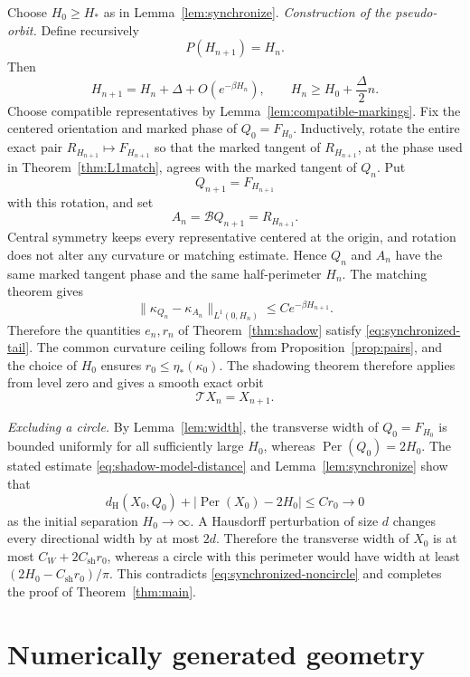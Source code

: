 \documentclass[11pt]{article}
\theoremstyle{remark}
\newcommand{\Tmap}{\mathcal T}
\newcommand{\Bmap}{\mathcal B}
\newcommand{\norm}[1]{\lVert #1\rVert}
\newcommand{\Per}{\operatorname{Per}}
\begin{document}
Choose \(H_0\geq H_*\) as in Lemma~\ref{lem:synchronize}.
\emph{Construction of the pseudo-orbit.}
Define recursively
\begin{equation}\label{eq:Hrec}
  P(H_{n+1})=H_n.
\end{equation}
Then
\[
  H_{n+1}=H_n+\Delta+O(e^{-\beta H_n}),
  \qquad
  H_n\geq H_0+\frac\Delta2n.
\]
Choose compatible representatives by Lemma~\ref{lem:compatible-markings}.
Fix the centered orientation and marked phase of \(Q_0=F_{H_0}\).
Inductively, rotate the entire exact pair
\(R_{H_{n+1}}\mapsto F_{H_{n+1}}\) so that the marked tangent of
\(R_{H_{n+1}}\), at the phase used in Theorem~\ref{thm:L1match}, agrees with
the marked tangent of \(Q_n\).  Put
\[
  Q_{n+1}=F_{H_{n+1}}
\]
with this rotation, and set
\[
  A_n=\Bmap Q_{n+1}=R_{H_{n+1}}.
\]
Central symmetry keeps every representative centered at the origin, and
rotation does not alter any curvature or matching estimate.  Hence \(Q_n\)
and \(A_n\) have the same marked tangent phase and the same half-perimeter
\(H_n\).  The matching theorem gives
\[
  \norm{\kappa_{Q_n}-\kappa_{A_n}}_{L^1(0,H_n)}
  \leq Ce^{-\beta H_{n+1}}.
\]
Therefore the quantities \(e_n,r_n\) of
Theorem~\ref{thm:shadow} satisfy \eqref{eq:synchronized-tail}.  The common
curvature ceiling follows from Proposition~\ref{prop:pairs}, and the choice
of \(H_0\) ensures \(r_0\leq\eta_*(\kappa_0)\).  The shadowing theorem
therefore applies from level zero and gives a smooth exact orbit
\[
  \Tmap X_n=X_{n+1}.
\]

\emph{Excluding a circle.}
By Lemma~\ref{lem:width}, the transverse width of \(Q_0=F_{H_0}\) is
bounded uniformly for all sufficiently large \(H_0\), whereas
\(\Per(Q_0)=2H_0\).  The stated estimate \eqref{eq:shadow-model-distance} and
Lemma~\ref{lem:synchronize} show that
\[
   d_{\mathrm H}(X_0,Q_0)+|\Per(X_0)-2H_0|
      \leq Cr_0\longrightarrow0
\]
as the initial separation \(H_0\to\infty\).  A Hausdorff perturbation of
size \(d\) changes every directional width by at most \(2d\).  Therefore the
transverse width of \(X_0\) is at most \(C_W+2C_{\mathrm{sh}}r_0\), whereas a
circle with this perimeter would have width at least
\((2H_0-C_{\mathrm{sh}}r_0)/\pi\).  This contradicts \eqref{eq:synchronized-noncircle} and completes the proof of
Theorem~\ref{thm:main}.

\clearpage
\appendix
\section{Numerically generated geometry}\label{app:schematic}
\end{document}
